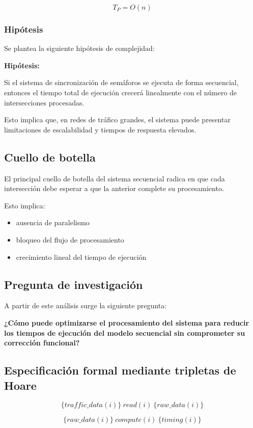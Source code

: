 \documentclass[12pt]{article}
\begin{document}
\[
T_P = O(n)
\]

\subsubsection{Hipótesis}

Se plantea la siguiente hipótesis de complejidad:

\textbf{Hipótesis:}

Si el sistema de sincronización de semáforos se ejecuta de forma secuencial, entonces el tiempo total de ejecución crecerá linealmente con el número de intersecciones procesadas.

Esto implica que, en redes de tráfico grandes, el sistema puede presentar limitaciones de escalabilidad y tiempos de respuesta elevados.

\subsection{Cuello de botella}

El principal cuello de botella del sistema secuencial radica en que cada intersección debe esperar a que la anterior complete su procesamiento.

Esto implica:

\begin{itemize}
\item ausencia de paralelismo
\item bloqueo del flujo de procesamiento
\item crecimiento lineal del tiempo de ejecución
\end{itemize}

\subsection{Pregunta de investigación}

A partir de este análisis surge la siguiente pregunta:

\textbf{¿Cómo puede optimizarse el procesamiento del sistema para reducir los tiempos de ejecución del modelo secuencial sin comprometer su corrección funcional?}

\subsection{Especificación formal mediante tripletas de Hoare}

\[
\{traffic\_data(i)\} \ read(i) \ \{raw\_data(i)\}
\]

\[
\{raw\_data(i)\} \ compute(i) \ \{timing(i)\}
\]
\end{document}
